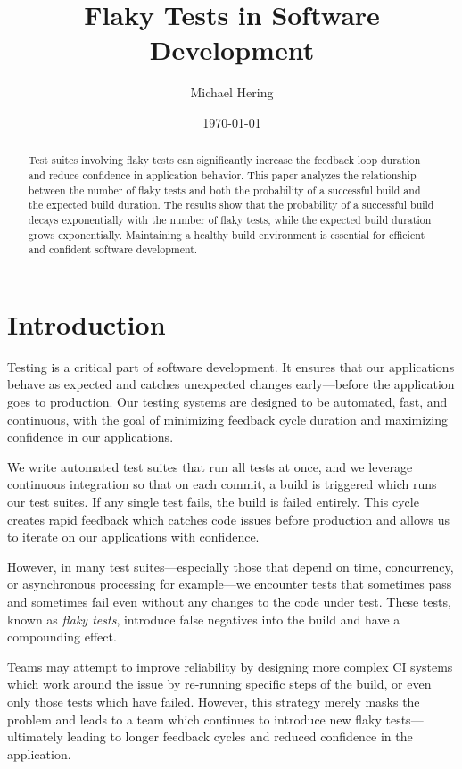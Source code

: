 \documentclass[letterpaper]{article}
\title{Flaky Tests in Software Development}
\author{Michael Hering}
\date{\today}
\begin{document}
\maketitle

\begin{abstract}    
    Test suites involving flaky tests can significantly increase the feedback loop duration and reduce confidence in application behavior. This paper analyzes the relationship between the number of flaky tests and both the probability of a successful build and the expected build duration. The results show that the probability of a successful build decays exponentially with the number of flaky tests, while the expected build duration grows exponentially. Maintaining a healthy build environment is essential for efficient and confident software development.
\end{abstract}

\section{Introduction}

Testing is a critical part of software development. It ensures that our applications behave as expected and catches unexpected changes early—before the application goes to production. Our testing systems are designed to be automated, fast, and continuous, with the goal of minimizing feedback cycle duration and maximizing confidence in our applications. 

We write automated test suites that run all tests at once, and we leverage continuous integration so that on each commit, a build is triggered which runs our test suites. If any single test fails, the build is failed entirely. This cycle creates rapid feedback which catches code issues before production and allows us to iterate on our applications with confidence.

However, in many test suites—especially those that depend on time, concurrency, or asynchronous processing for example—we encounter tests that sometimes pass and sometimes fail even without any changes to the code under test. These tests, known as \emph{flaky tests}, introduce false negatives into the build and have a compounding effect.

Teams may attempt to improve reliability by designing more complex CI systems which work around the issue by re-running specific steps of the build, or even only those tests which have failed. However, this strategy merely masks the problem and leads to a team which continues to introduce new flaky tests—ultimately leading to longer feedback cycles and reduced confidence in the application. 
\end{document}
